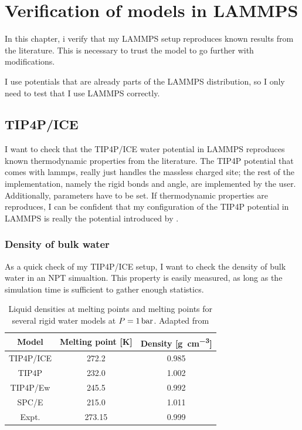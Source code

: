 \chapter{Verification of models in LAMMPS}
\label{ch:verification}
In this chapter, i verify that my LAMMPS setup reproduces known results from the literature. This is necessary to trust the model to go further with modifications.

I use potentials that are already parts of the LAMMPS distribution, so I only need to test that I use LAMMPS correctly. 

\section{TIP4P/ICE}
I want to check that the TIP4P/ICE water potential in LAMMPS reproduces known thermodynamic properties from the literature. The TIP4P potential that comes with lammps, really just handles the massless charged site; the rest of the implementation, namely the rigid bonds and angle, are implemented by the user. Additionally, parameters have to be set. If thermodynamic properties are reproduces, I can be confident that my configuration of the TIP4P potential in LAMMPS is really the potential introduced by \cite{Abascal2005}. 

\subsection{Density of bulk water}
As a quick check of my TIP4P/ICE setup, I want to check the density of bulk water in an NPT simualtion. This property is easily measured, as long as the simulation time is sufficient to gather enough statistics. 

\begin{table}
\centering
\caption{Liquid densities at melting points and melting points for several rigid water models at $P = \text{\SI{1}{\bar}}$. Adapted from \cite{Abascal2005}}
\begin{tabular}{c|cc}
Model & Melting point [K] & Density [\si{\gram\per\cubic\cm}] \\
\hline
TIP4P/ICE 	& 272.2 	& 0.985 \\
TIP4P 		& 232.0 	& 1.002 \\
TIP4P/Ew 	& 245.5 	& 0.992 \\
SPC/E 		& 215.0 	& 1.011 \\
Expt. 		& 273.15 	& 0.999
\end{tabular}
\end{table}

